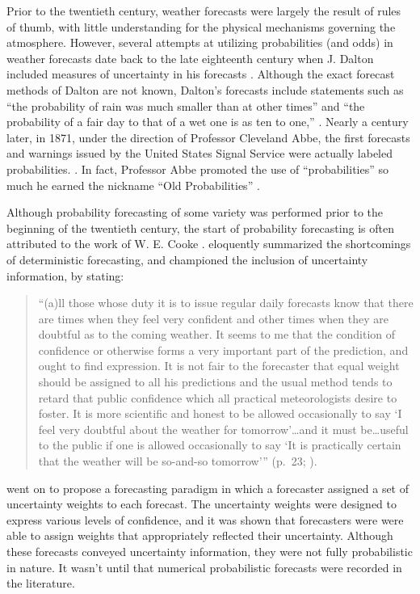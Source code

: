 Prior to the twentieth century, weather forecasts were largely the result of rules of thumb, with little understanding for the physical mechanisms governing the atmosphere.
However, several attempts at utilizing probabilities (and odds) in weather forecasts date back to the late eighteenth century when J. Dalton included measures of uncertainty in his forecasts \citep{Dalton1793, Murphy1998}.
Although the exact forecast methods of Dalton are not known, Dalton's forecasts include statements such as ``the probability of rain was much smaller than at other times'' and ``the probability of a fair day to that of a wet one is as ten to one,'' \citep{Murphy1998}.
Nearly a century later, in 1871, under the direction of Professor Cleveland Abbe, the first forecasts and warnings issued by the United States Signal Service were actually labeled probabilities. \citep{Whitnah1961, Murphy1998}.
In fact, Professor Abbe promoted the use of ``probabilities'' so much he earned the nickname ``Old Probabilities'' \citep{Scott1873, Murphy1998}.


Although probability forecasting of some variety was performed prior to the beginning of the twentieth century, the start of probability forecasting is often attributed to the work of W. E. Cooke \citep{Murphy1998}.
\cite{Cooke1906a} eloquently summarized the shortcomings of deterministic forecasting, and championed the inclusion of uncertainty information, by stating:
\begin{quote}
    ``(a)ll those whose duty it is to issue regular daily forecasts know that there are times when they feel very confident and other times when they are doubtful as to the coming weather. It seems to me that the condition of confidence or otherwise forms a very important part of the prediction, and ought to find expression. It is not fair to the forecaster that equal weight should be assigned to all his predictions and the usual method tends to retard that public confidence which all practical meteorologists desire to foster. It is more scientific and honest to be allowed occasionally to say `I feel very doubtful about the weather for tomorrow'\dots and it must be\dots useful to the public if one is allowed occasionally to say `It is practically certain that the weather will be so-and-so tomorrow''' (\mbox{p. 23}; \citealp{Murphy1998}).
\end{quote}


\noindent\cite{Cooke1906a} went on to propose a forecasting paradigm in which a forecaster assigned a set of uncertainty weights to each forecast.
The uncertainty weights were designed to express various levels of confidence, and it was shown that forecasters were were able to assign weights that appropriately reflected their uncertainty.
Although these forecasts conveyed uncertainty information, they were not fully probabilistic in nature.
It wasn't until \cite{Hallenbeck1920} that numerical probabilistic forecasts were recorded in the literature.


